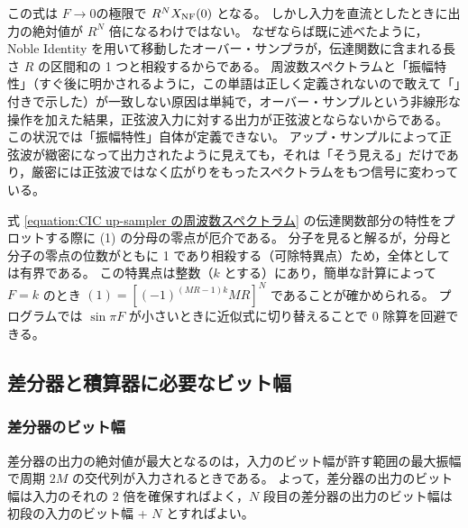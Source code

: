         この式は $F\to 0$の極限で $R^N X_\text{NF}(0)$ となる。
        しかし入力を直流としたときに出力の絶対値が $R^N$ 倍になるわけではない。
        なぜならば既に述べたように， Noble Identity を用いて移動したオーバー・サンプラが，伝達関数に含まれる長さ $R$ の区間和の 1 つと相殺するからである。
        周波数スペクトラムと「振幅特性」（すぐ後に明かされるように，この単語は正しく定義されないので敢えて「」付きで示した）が一致しない原因は単純で，オーバー・サンプルという非線形な操作を加えた結果，正弦波入力に対する出力が正弦波とならないからである。
        この状況では「振幅特性」自体が定義できない。
        アップ・サンプルによって正弦波が緻密になって出力されたように見えても，それは「そう見える」だけであり，厳密には正弦波ではなく広がりをもったスペクトラムをもつ信号に変わっている。
        \par
        式 \eqref{equation:CIC up-sampler の周波数スペクトラム} の伝達関数部分の特性をプロットする際に (1) の分母の零点が厄介である。
        分子を見ると解るが，分母と分子の零点の位数がともに 1 であり相殺する（可除特異点）ため，全体としては有界である。
        この特異点は整数（$k$ とする）にあり，簡単な計算によって $F=k$ のとき $(1) = [(-1)^{(MR-1)k} MR]^N$ であることが確かめられる。
        プログラムでは $\sin\pi F$ が小さいときに近似式に切り替えることで 0 除算を回避できる。
    \subsection{差分器と積算器に必要なビット幅}
        \subsubsection{差分器のビット幅}
            差分器の出力の絶対値が最大となるのは，入力のビット幅が許す範囲の最大振幅で周期 $2M$ の交代列が入力されるときである。
            よって，差分器の出力のビット幅は入力のそれの 2 倍を確保すればよく，$N$ 段目の差分器の出力のビット幅は初段の入力のビット幅 + $N$ とすればよい。
